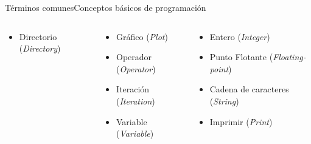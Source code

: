 \documentclass[spanish, handout]{beamer}
\begin{document}
\begin{frame}{Términos comunes}{Conceptos básicos de programación}
\begin{columns}
\begin{column}{0.33\textwidth}
\begin{itemize}
                \item Directorio (\textit{Directory})
            \end{itemize}
        \end{column}
        \begin{column}{0.33\textwidth}
            \begin{itemize}
                \item Gráfico (\textit{Plot})
                \item Operador (\textit{Operator})
                \item Iteración (\textit{Iteration})
                \item Variable (\textit{Variable})
            \end{itemize}
        \end{column}
        \begin{column}{0.33\textwidth}
            \begin{itemize}
                \item Entero (\textit{Integer})
                \item Punto Flotante (\textit{Floating-point})
                \item Cadena de caracteres (\textit{String})
                \item Imprimir (\textit{Print})
            \end{itemize}
        \end{column}
    \end{columns}
\end{frame}





\end{document}
